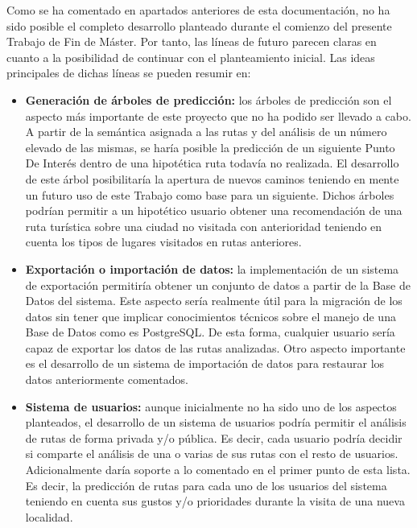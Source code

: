 Como se ha comentado en apartados anteriores de esta documentación, no ha sido posible el completo desarrollo planteado durante el comienzo del presente Trabajo de Fin de Máster. Por tanto, las líneas de futuro parecen claras en cuanto a la posibilidad de continuar con el planteamiento inicial. Las ideas principales de dichas líneas se pueden resumir en:

\begin{itemize}
	\item \textbf{Generación de árboles de predicción:} \cite{tree:info} los árboles de predicción son el aspecto más importante de este proyecto que no ha podido ser llevado a cabo. A partir de la semántica asignada a las rutas y del análisis de un número elevado de las mismas, se haría posible la predicción de un siguiente Punto De Interés dentro de una hipotética ruta todavía no realizada. El desarrollo de este árbol posibilitaría la apertura de nuevos caminos teniendo en mente un futuro uso de este Trabajo como base para un siguiente.
	Dichos árboles podrían permitir a un hipotético usuario obtener una recomendación de una ruta turística sobre una ciudad no visitada con anterioridad teniendo en cuenta los tipos de lugares visitados en rutas anteriores.
	
	 \item \textbf{Exportación o importación de datos:} la implementación de un sistema de exportación permitiría obtener un conjunto de datos a partir de la Base de Datos del sistema. Este aspecto sería realmente útil para la migración de los datos sin tener que implicar conocimientos técnicos sobre el manejo de una Base de Datos como es PostgreSQL. De esta forma, cualquier usuario sería capaz de exportar los datos de las rutas analizadas.
	Otro aspecto importante es el desarrollo de un sistema de importación de datos para restaurar los datos anteriormente comentados.
	\item \textbf{Sistema de usuarios:} aunque inicialmente no ha sido uno de los aspectos planteados, el desarrollo de un sistema de usuarios podría permitir el análisis de rutas de forma privada y/o pública. Es decir, cada usuario podría decidir si comparte el análisis de una o varias de sus rutas con el resto de usuarios.
	Adicionalmente daría soporte a lo comentado en el primer punto de esta lista. Es decir, la predicción de rutas para cada uno de los usuarios del sistema teniendo en cuenta sus gustos y/o prioridades durante la visita de una nueva localidad.
\end{itemize}
